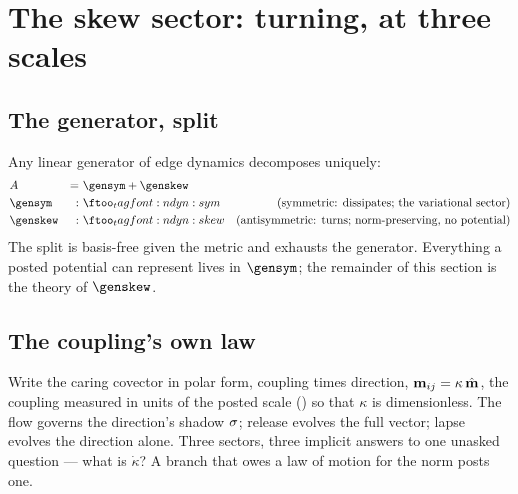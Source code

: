 \documentclass[../main]{subfiles}
\begin{document}

\clearpage
\section{The skew sector: turning, at three scales}
\label{sec:oscillation}

\subsection{The generator, split}
\label{subsec:osc:split}
%
\begin{definition}
%
  Any linear generator of edge dynamics decomposes uniquely:
  \begin{align}
    &A &=& \ \gensym + \genskew \label{eq:dyn:split}\\
    &\gensym  &:& \eqtag{dyn:sym}{symmetric: dissipates; the variational sector}\\
    &\genskew &:& \eqtag{dyn:skew}{antisymmetric: turns; norm-preserving, no potential}
  \end{align}
  The split is basis-free given the metric and exhausts the generator. Everything a
  posted potential can represent lives in $\gensym$; the remainder of this section is the
  theory of $\genskew$.
\end{definition}

\subsection{The coupling's own law}
\label{subsec:osc:polar}
%
Write the caring covector in polar form, coupling times direction,
$\mathbf{m}\sb{ ij }=\kappa\,\hat{\mathbf m}$, the coupling measured in units of the
posted scale () so that $\kappa$ is dimensionless. The flow governs the
direction's shadow $\sigma$; release evolves the full vector; lapse evolves the
direction alone. Three sectors, three implicit answers to one unasked question ---
what is $\dot\kappa$? A branch that owes a law of motion for the norm posts one.
\end{document}
